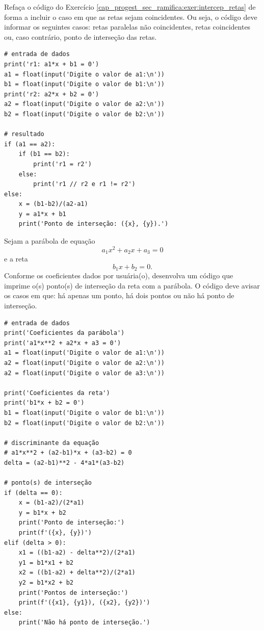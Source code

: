 \begin{exer}
  Refaça o código do Exercício \ref{cap_progest_sec_ramifica:exer:intercep_retas} de forma a incluir o caso em que as retas sejam coincidentes. Ou seja, o código deve informar os seguintes casos: retas paralelas não coincidentes, retas coincidentes ou, caso contrário, ponto de interseção das retas.
\end{exer}
\begin{resp}

\begin{lstlisting}
# entrada de dados
print('r1: a1*x + b1 = 0')
a1 = float(input('Digite o valor de a1:\n'))
b1 = float(input('Digite o valor de b1:\n'))
print('r2: a2*x + b2 = 0')
a2 = float(input('Digite o valor de a2:\n'))
b2 = float(input('Digite o valor de b2:\n'))

# resultado
if (a1 == a2):
    if (b1 == b2):
        print('r1 = r2')
    else:
        print('r1 // r2 e r1 != r2')
else:
    x = (b1-b2)/(a2-a1)
    y = a1*x + b1
    print('Ponto de interseção: ({x}, {y}).')
\end{lstlisting}

\end{resp}

\begin{exer}
  Sejam a parábola de equação
  \begin{equation}
    a_1x^2 + a_2x + a_3 = 0
  \end{equation}
  e a reta
  \begin{equation}
    b_1x + b_2 = 0.
  \end{equation}
  Conforme os coeficientes dados por usuária(o), desenvolva um código que imprime o(s) ponto(s) de interseção da reta com a parábola. O código deve avisar os casos em que: há apenas um ponto, há dois pontos ou não há ponto de interseção.
\end{exer}
\begin{resp}

\begin{lstlisting}
# entrada de dados
print('Coeficientes da parábola')
print('a1*x**2 + a2*x + a3 = 0')
a1 = float(input('Digite o valor de a1:\n'))
a2 = float(input('Digite o valor de a2:\n'))
a2 = float(input('Digite o valor de a3:\n'))

print('Coeficientes da reta')
print('b1*x + b2 = 0')
b1 = float(input('Digite o valor de b1:\n'))
b2 = float(input('Digite o valor de b2:\n'))

# discriminante da equação
# a1*x**2 + (a2-b1)*x + (a3-b2) = 0
delta = (a2-b1)**2 - 4*a1*(a3-b2)

# ponto(s) de interseção
if (delta == 0):
    x = (b1-a2)/(2*a1)
    y = b1*x + b2
    print('Ponto de interseção:')
    print(f'({x}, {y})')
elif (delta > 0):
    x1 = ((b1-a2) - delta**2)/(2*a1)
    y1 = b1*x1 + b2
    x2 = ((b1-a2) + delta**2)/(2*a1)
    y2 = b1*x2 + b2
    print('Pontos de interseção:')
    print(f'({x1}, {y1}), ({x2}, {y2})')
else:
    print('Não há ponto de interseção.')
\end{lstlisting}

\end{resp}

